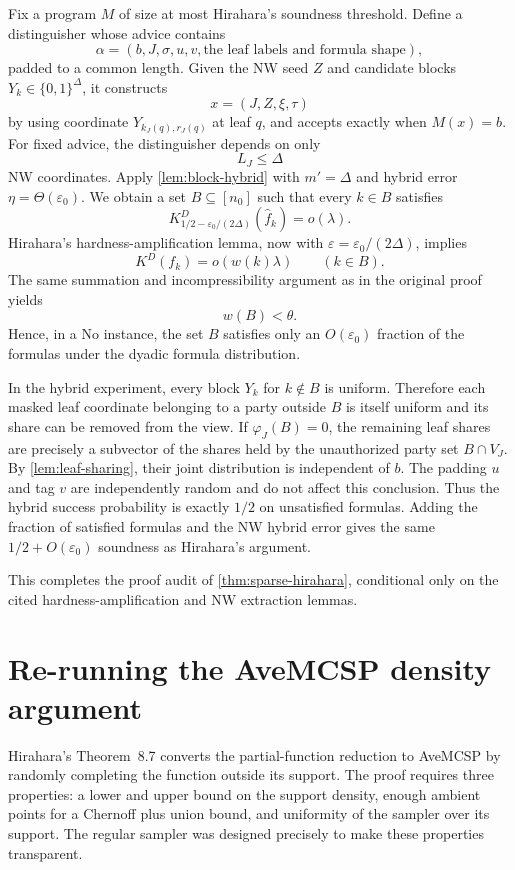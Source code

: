 \documentclass[11pt]{article}
\theoremstyle{definition}
\newcommand{\bits}{\{0,1\}}
\newcommand{\eps}{\varepsilon}
\begin{document}
Fix a program $M$ of size at most Hirahara's soundness threshold.  Define a distinguisher whose advice contains
\[
 \alpha=(b,J,\sigma,u,v,\text{the leaf labels and formula shape}),
\]
padded to a common length.  Given the NW seed $Z$ and candidate blocks
$Y_k\in\bits^\Delta$, it constructs
\[
 x=(J,Z,\xi,\tau)
\]
by using coordinate $Y_{k_J(q),r_J(q)}$ at leaf $q$, and accepts exactly when $M(x)=b$.
For fixed advice, the distinguisher depends on only
\[
 L_J\le\Delta
\]
NW coordinates.  Apply \cref{lem:block-hybrid} with $m'=\Delta$ and hybrid error $\eta=\Theta(\eps_0)$.  We obtain a set $B\subseteq[n_0]$ such that every $k\in B$ satisfies
\[
 K^D_{1/2-\eps_0/(2\Delta)}(\widehat f_k)=o(\lambda).
\]
Hirahara's hardness-amplification lemma, now with
$\eps=\eps_0/(2\Delta)$, implies
\[
 K^D(f_k)=o(w(k)\lambda)
 \qquad(k\in B).
\]
The same summation and incompressibility argument as in the original proof yields
\[
 w(B)<\theta.
\]
Hence, in a No instance, the set $B$ satisfies only an $O(\eps_0)$ fraction of the formulas under the dyadic formula distribution.

In the hybrid experiment, every block $Y_k$ for $k\notin B$ is uniform.  Therefore each masked leaf coordinate belonging to a party outside $B$ is itself uniform and its share can be removed from the view.  If $\varphi_J(B)=0$, the remaining leaf shares are precisely a subvector of the shares held by the unauthorized party set $B\cap V_J$.  By \cref{lem:leaf-sharing}, their joint distribution is independent of $b$.  The padding $u$ and tag $v$ are independently random and do not affect this conclusion.  Thus the hybrid success probability is exactly $1/2$ on unsatisfied formulas.  Adding the fraction of satisfied formulas and the NW hybrid error gives the same $1/2+O(\eps_0)$ soundness as Hirahara's argument.

This completes the proof audit of \cref{thm:sparse-hirahara}, conditional only on the cited hardness-amplification and NW extraction lemmas.

\section{Re-running the AveMCSP density argument}

Hirahara's Theorem~8.7 converts the partial-function reduction to AveMCSP by randomly completing the function outside its support.  The proof requires three properties: a lower and upper bound on the support density, enough ambient points for a Chernoff plus union bound, and uniformity of the sampler over its support.  The regular sampler was designed precisely to make these properties transparent.
\end{document}
